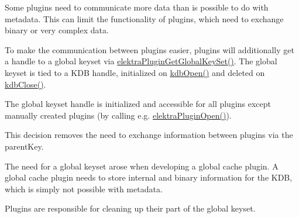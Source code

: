 Some plugins need to communicate more data than is possible to do with metadata. This can limit the functionality of plugins, which need to exchange binary or very complex data.

To make the communication between plugins easier, plugins will additionally get a handle to a global keyset via {\ttfamily \hyperlink{group__plugin_ga436cda13ed70c0face08661a90620bf6}{elektra\+Plugin\+Get\+Global\+Key\+Set()}}. The global keyset is tied to a K\+DB handle, initialized on {\ttfamily \hyperlink{group__kdb_ga6808defe5870f328dd17910aacbdc6ca}{kdb\+Open()}} and deleted on {\ttfamily \hyperlink{group__kdb_gadb54dc9fda17ee07deb9444df745c96f}{kdb\+Close()}}.

The global keyset handle is initialized and accessible for all plugins except manually created plugins (by calling e.\+g. {\ttfamily \hyperlink{elektra_2plugin_8c_a32a70a7876542c51d153164ac5108a57}{elektra\+Plugin\+Open()}}).

This decision removes the need to exchange information between plugins via the parent\+Key.

The need for a global keyset arose when developing a global cache plugin. A global cache plugin needs to store internal and binary information for the K\+DB, which is simply not possible with metadata.

Plugins are responsible for cleaning up their part of the global keyset.